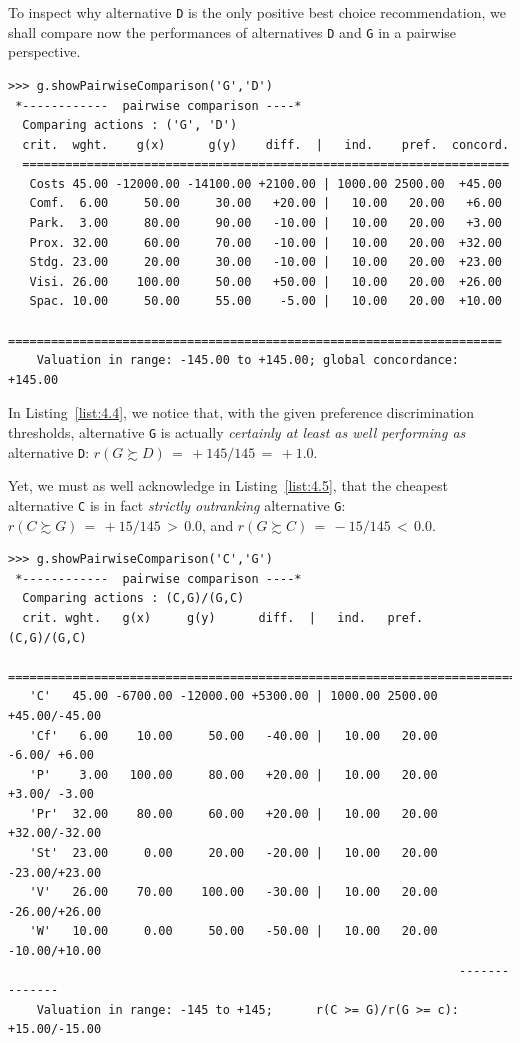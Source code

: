 To inspect why alternative \texttt{D} is the only positive best choice recommendation, we shall compare now the performances of alternatives \texttt{D} and \texttt{G} in a pairwise perspective.
\begin{lstlisting}[caption={Inspecting pairwise comparison between alternatives \texttt{G} and \texttt{D}},label=list:4.4,basicstyle=\ttfamily\scriptsize]
>>> g.showPairwiseComparison('G','D')
 *------------  pairwise comparison ----*
  Comparing actions : ('G', 'D')
  crit.  wght.    g(x)      g(y)    diff.  |   ind.    pref.  concord. 
  ====================================================================
   Costs 45.00 -12000.00 -14100.00 +2100.00 | 1000.00 2500.00  +45.00  
   Comf.  6.00     50.00     30.00   +20.00 |   10.00   20.00   +6.00 
   Park.  3.00     80.00     90.00   -10.00 |   10.00   20.00   +3.00 
   Prox. 32.00     60.00     70.00   -10.00 |   10.00   20.00  +32.00 
   Stdg. 23.00     20.00     30.00   -10.00 |   10.00   20.00  +23.00 
   Visi. 26.00    100.00     50.00   +50.00 |   10.00   20.00  +26.00 
   Spac. 10.00     50.00     55.00    -5.00 |   10.00   20.00  +10.00
   =====================================================================
    Valuation in range: -145.00 to +145.00; global concordance: +145.00
\end{lstlisting}
In Listing~\ref{list:4.4}, we notice that, with the given preference discrimination thresholds, alternative \texttt{G} is actually \emph{certainly at least as well performing as} alternative \texttt{D}:  $r(G \succsim D)\, = \, +145/145\, =\, +1.0$.

Yet, we must as well acknowledge in Listing~\ref{list:4.5}, that the cheapest alternative \texttt{C} is in fact \emph{strictly outranking} alternative \texttt{G}:  $r(C \succsim G)\, =\, +15/145\, >\, 0.0$, and $r(G \succsim C)\, =\, -15/145 \,<\, 0.0$.
\begin{lstlisting}[caption={Inspecting pairwise comparison between alternatives \texttt{C} and \texttt{G}},label=list:4.5,basicstyle=\ttfamily\scriptsize]
>>> g.showPairwiseComparison('C','G')
 *------------  pairwise comparison ----*
  Comparing actions : (C,G)/(G,C)
  crit. wght.   g(x)     g(y)      diff.  |   ind.   pref.       (C,G)/(G,C)
   ==========================================================================
   'C'   45.00 -6700.00 -12000.00 +5300.00 | 1000.00 2500.00    +45.00/-45.00 
   'Cf'   6.00    10.00     50.00   -40.00 |   10.00   20.00     -6.00/ +6.00 
   'P'    3.00   100.00     80.00   +20.00 |   10.00   20.00     +3.00/ -3.00 
   'Pr'  32.00    80.00     60.00   +20.00 |   10.00   20.00    +32.00/-32.00 
   'St'  23.00     0.00     20.00   -20.00 |   10.00   20.00    -23.00/+23.00 
   'V'   26.00    70.00    100.00   -30.00 |   10.00   20.00    -26.00/+26.00 
   'W'   10.00     0.00     50.00   -50.00 |   10.00   20.00    -10.00/+10.00
                                                               --------------
    Valuation in range: -145 to +145;      r(C >= G)/r(G >= c): +15.00/-15.00
\end{lstlisting}

